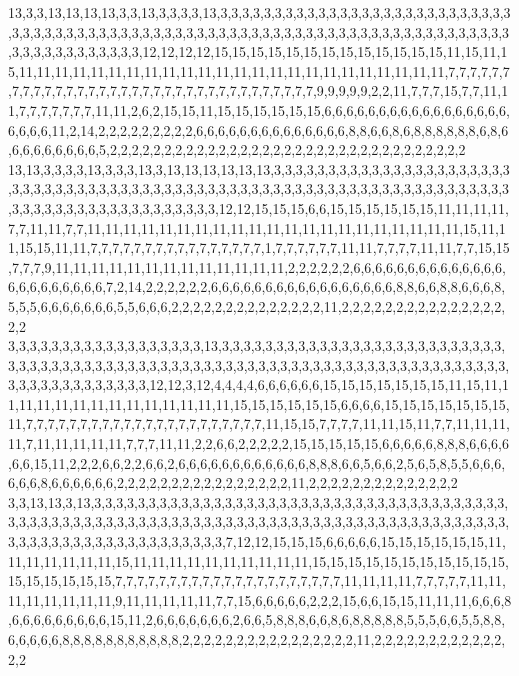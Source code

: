 13,3,3,13,13,13,13,3,3,13,3,3,3,3,13,3,3,3,3,3,3,3,3,3,3,3,3,3,3,3,3,3,3,3,3,3,3,3,3,3,3,3,3,3,3,3,3,3,3,3,3,3,3,3,3,3,3,3,3,3,3,3,3,3,3,3,3,3,3,3,3,3,3,3,3,3,3,3,3,3,3,3,3,3,3,3,3,3,3,3,3,3,3,3,3,3,3,3,3,3,12,12,12,12,15,15,15,15,15,15,15,15,15,15,15,15,15,11,15,11,15,11,11,11,11,11,11,11,11,11,11,11,11,11,11,11,11,11,11,11,11,11,11,11,11,7,7,7,7,7,7,7,7,7,7,7,7,7,7,7,7,7,7,7,7,7,7,7,7,7,7,7,7,7,7,7,7,7,7,9,9,9,9,9,2,2,11,7,7,7,15,7,7,11,11,7,7,7,7,7,7,7,11,11,2,6,2,15,15,11,15,15,15,15,15,15,6,6,6,6,6,6,6,6,6,6,6,6,6,6,6,6,6,6,6,6,6,11,2,14,2,2,2,2,2,2,2,2,2,6,6,6,6,6,6,6,6,6,6,6,6,6,6,8,8,6,6,8,6,8,8,8,8,8,8,6,8,6,6,6,6,6,6,6,6,6,5,2,2,2,2,2,2,2,2,2,2,2,2,2,2,2,2,2,2,2,2,2,2,2,2,2,2,2,2,2,2,2,2,2
13,13,3,3,3,3,13,3,3,3,13,3,13,13,13,13,13,13,3,3,3,3,3,3,3,3,3,3,3,3,3,3,3,3,3,3,3,3,3,3,3,3,3,3,3,3,3,3,3,3,3,3,3,3,3,3,3,3,3,3,3,3,3,3,3,3,3,3,3,3,3,3,3,3,3,3,3,3,3,3,3,3,3,3,3,3,3,3,3,3,3,3,3,3,3,3,3,3,3,3,3,3,3,3,3,12,12,15,15,15,6,6,15,15,15,15,15,15,11,11,11,11,7,7,11,11,7,7,11,11,11,11,11,11,11,11,11,11,11,11,11,11,11,11,11,11,11,11,11,15,11,11,15,15,11,11,7,7,7,7,7,7,7,7,7,7,7,7,7,7,7,7,1,7,7,7,7,7,7,11,11,7,7,7,7,11,11,7,7,15,15,7,7,7,9,11,11,11,11,11,11,11,11,11,11,11,11,11,2,2,2,2,2,2,6,6,6,6,6,6,6,6,6,6,6,6,6,6,6,6,6,6,6,6,6,6,6,7,2,14,2,2,2,2,2,2,6,6,6,6,6,6,6,6,6,6,6,6,6,6,6,6,6,8,8,6,6,8,8,6,6,6,8,5,5,5,6,6,6,6,6,6,6,5,5,6,6,6,2,2,2,2,2,2,2,2,2,2,2,2,2,2,11,2,2,2,2,2,2,2,2,2,2,2,2,2,2,2,2,2
3,3,3,3,3,3,3,3,3,3,3,3,3,3,3,3,3,3,13,3,3,3,3,3,3,3,3,3,3,3,3,3,3,3,3,3,3,3,3,3,3,3,3,3,3,3,3,3,3,3,3,3,3,3,3,3,3,3,3,3,3,3,3,3,3,3,3,3,3,3,3,3,3,3,3,3,3,3,3,3,3,3,3,3,3,3,3,3,3,3,3,3,3,3,3,3,3,3,3,3,3,3,3,3,12,12,3,12,4,4,4,4,6,6,6,6,6,6,15,15,15,15,15,15,15,11,15,11,11,11,11,11,11,11,11,11,11,11,11,11,11,15,15,15,15,15,15,6,6,6,6,15,15,15,15,15,15,15,11,7,7,7,7,7,7,7,7,7,7,7,7,7,7,7,7,7,7,7,7,7,7,11,15,15,7,7,7,7,11,11,15,11,7,7,11,11,11,11,7,11,11,11,11,11,7,7,7,11,11,2,2,6,6,2,2,2,2,2,15,15,15,15,15,6,6,6,6,6,8,8,8,6,6,6,6,6,6,15,11,2,2,2,6,6,2,2,6,6,2,6,6,6,6,6,6,6,6,6,6,6,6,8,8,8,6,6,5,6,6,2,5,6,5,8,5,5,6,6,6,6,6,6,8,6,6,6,6,6,6,2,2,2,2,2,2,2,2,2,2,2,2,2,2,2,2,11,2,2,2,2,2,2,2,2,2,2,2,2,2,2
3,3,13,13,3,13,3,3,3,3,3,3,3,3,3,3,3,3,3,3,3,3,3,3,3,3,3,3,3,3,3,3,3,3,3,3,3,3,3,3,3,3,3,3,3,3,3,3,3,3,3,3,3,3,3,3,3,3,3,3,3,3,3,3,3,3,3,3,3,3,3,3,3,3,3,3,3,3,3,3,3,3,3,3,3,3,3,3,3,3,3,3,3,3,3,3,3,3,3,3,3,3,3,3,3,3,3,3,3,3,7,12,12,15,15,15,6,6,6,6,6,15,15,15,15,15,15,11,11,11,11,11,11,11,15,11,11,11,11,11,11,11,11,11,11,15,15,15,15,15,15,15,15,15,15,15,15,15,15,15,15,15,7,7,7,7,7,7,7,7,7,7,7,7,7,7,7,7,7,7,7,7,7,11,11,11,11,7,7,7,7,7,11,11,11,11,11,11,11,11,9,11,11,11,11,11,7,7,15,6,6,6,6,6,2,2,2,15,6,6,15,15,11,11,11,6,6,6,8,6,6,6,6,6,6,6,6,6,15,11,2,6,6,6,6,6,6,6,2,6,6,5,8,8,8,6,6,8,6,8,8,8,8,8,5,5,5,6,6,5,5,8,8,6,6,6,6,6,8,8,8,8,8,8,8,8,8,8,8,2,2,2,2,2,2,2,2,2,2,2,2,2,2,2,2,11,2,2,2,2,2,2,2,2,2,2,2,2,2,2
